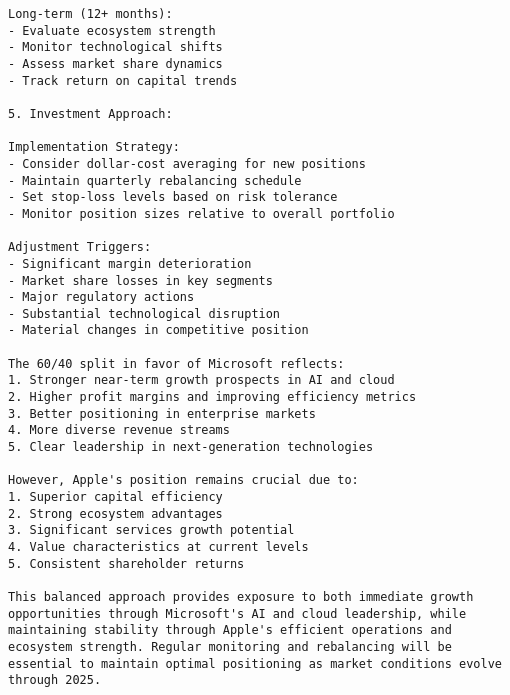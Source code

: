 \begin{lstlisting}
Long-term (12+ months):
- Evaluate ecosystem strength
- Monitor technological shifts
- Assess market share dynamics
- Track return on capital trends

5. Investment Approach:

Implementation Strategy:
- Consider dollar-cost averaging for new positions
- Maintain quarterly rebalancing schedule
- Set stop-loss levels based on risk tolerance
- Monitor position sizes relative to overall portfolio

Adjustment Triggers:
- Significant margin deterioration
- Market share losses in key segments
- Major regulatory actions
- Substantial technological disruption
- Material changes in competitive position

The 60/40 split in favor of Microsoft reflects:
1. Stronger near-term growth prospects in AI and cloud
2. Higher profit margins and improving efficiency metrics
3. Better positioning in enterprise markets
4. More diverse revenue streams
5. Clear leadership in next-generation technologies

However, Apple's position remains crucial due to:
1. Superior capital efficiency
2. Strong ecosystem advantages
3. Significant services growth potential
4. Value characteristics at current levels
5. Consistent shareholder returns

This balanced approach provides exposure to both immediate growth opportunities through Microsoft's AI and cloud leadership, while maintaining stability through Apple's efficient operations and ecosystem strength. Regular monitoring and rebalancing will be essential to maintain optimal positioning as market conditions evolve through 2025.
\end{lstlisting}


